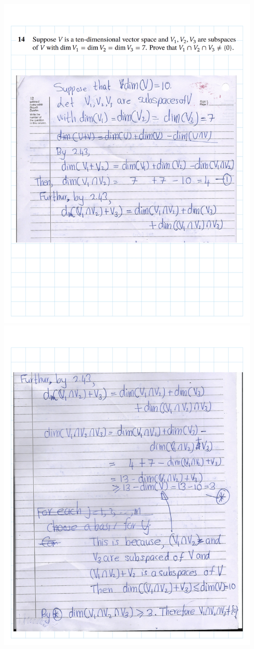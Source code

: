 \documentclass[
]{book}
\theoremstyle{definition}
\theoremstyle{definition}
\theoremstyle{definition}
\theoremstyle{definition}
\theoremstyle{remark}
\begin{document}
\includegraphics{fig/Ex 2B and 2C/Ex 2c (44).png}
\includegraphics{fig/Ex 2B and 2C/Ex 2c (45).png}
\end{document}
